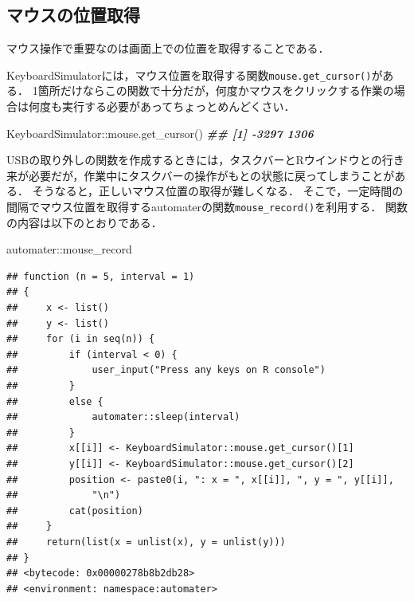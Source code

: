 \documentclass[
]{article}
\newenvironment{Shaded}{\begin{snugshade}}{\end{snugshade}}
\newcommand{\DocumentationTok}[1]{\textcolor[rgb]{0.56,0.35,0.01}{\textbf{\textit{#1}}}}
\newcommand{\FunctionTok}[1]{\textcolor[rgb]{0.00,0.00,0.00}{#1}}
\newcommand{\NormalTok}[1]{#1}
\newcommand{\SpecialCharTok}[1]{\textcolor[rgb]{0.00,0.00,0.00}{#1}}
\begin{document}
\hypertarget{ux30deux30a6ux30b9ux306eux4f4dux7f6eux53d6ux5f97}{%
\subsection{マウスの位置取得}\label{ux30deux30a6ux30b9ux306eux4f4dux7f6eux53d6ux5f97}}

マウス操作で重要なのは画面上での位置を取得することである．

KeyboardSimulatorには，マウス位置を取得する関数\texttt{mouse.get\_cursor()}がある．
1箇所だけならこの関数で十分だが，何度かマウスをクリックする作業の場合は何度も実行する必要があってちょっとめんどくさい．

\begin{Shaded}
\begin{Highlighting}[]
\NormalTok{KeyboardSimulator}\SpecialCharTok{::}\FunctionTok{mouse.get\_cursor}\NormalTok{()}
 \DocumentationTok{\#\# [1] {-}3297  1306}
\end{Highlighting}
\end{Shaded}

USBの取り外しの関数を作成するときには，タスクバーとRウインドウとの行き来が必要だが，作業中にタスクバーの操作がもとの状態に戻ってしまうことがある．
そうなると，正しいマウス位置の取得が難しくなる．
そこで，一定時間の間隔でマウス位置を取得するautomaterの関数\texttt{mouse\_record()}を利用する．
関数の内容は以下のとおりである．

\begin{Shaded}
\begin{Highlighting}[]
\NormalTok{automater}\SpecialCharTok{::}\NormalTok{mouse\_record}
\end{Highlighting}
\end{Shaded}

\begin{verbatim}
## function (n = 5, interval = 1) 
## {
##     x <- list()
##     y <- list()
##     for (i in seq(n)) {
##         if (interval < 0) {
##             user_input("Press any keys on R console")
##         }
##         else {
##             automater::sleep(interval)
##         }
##         x[[i]] <- KeyboardSimulator::mouse.get_cursor()[1]
##         y[[i]] <- KeyboardSimulator::mouse.get_cursor()[2]
##         position <- paste0(i, ": x = ", x[[i]], ", y = ", y[[i]], 
##             "\n")
##         cat(position)
##     }
##     return(list(x = unlist(x), y = unlist(y)))
## }
## <bytecode: 0x00000278b8b2db28>
## <environment: namespace:automater>
\end{verbatim}
\end{document}
